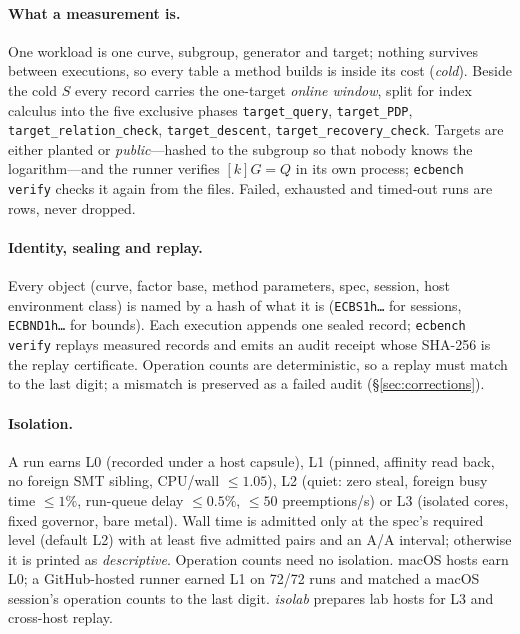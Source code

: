 \paragraph{What a measurement is.} One workload is one curve, subgroup,
generator and target; nothing survives between executions, so every table
a method builds is inside its cost (\emph{cold}). Beside the cold $S$
every record carries the one-target \emph{online window}, split for index
calculus into the five exclusive phases \texttt{target\_query},
\texttt{target\_PDP}, \texttt{target\_relation\_check},
\texttt{target\_descent}, \texttt{target\_recovery\_check}. Targets are
either planted or \emph{public}---hashed to the subgroup so that nobody
knows the logarithm---and the runner verifies $[k]G=Q$ in its own process;
\texttt{ecbench verify} checks it again from the files. Failed, exhausted
and timed-out runs are rows, never dropped.

\paragraph{Identity, sealing and replay.} Every object (curve, factor
base, method parameters, spec, session, host environment class) is named by
a hash of what it is (\texttt{ECBS1h\ldots} for sessions,
\texttt{ECBND1h\ldots} for bounds). Each execution appends one sealed
record; \texttt{ecbench verify} replays measured records and emits an audit
receipt whose SHA-256 is the replay certificate. Operation counts are
deterministic, so a replay must match to the last digit; a mismatch is
preserved as a failed audit (\S\ref{sec:corrections}).

\paragraph{Isolation.} A run earns L0 (recorded under a host capsule), L1
(pinned, affinity read back, no foreign SMT sibling, CPU/wall $\le1.05$),
L2 (quiet: zero steal, foreign busy time $\le1\%$, run-queue delay
$\le0.5\%$, $\le50$ preemptions/s) or L3 (isolated cores, fixed governor,
bare metal). Wall time is admitted only at the spec's required level
(default L2) with at least five admitted pairs and an A/A interval;
otherwise it is printed as \emph{descriptive}. Operation counts need no
isolation. macOS hosts earn L0; a GitHub-hosted runner earned L1 on 72/72
runs and matched a macOS session's operation counts to the last digit.
\emph{isolab} prepares lab hosts for L3 and cross-host replay.

